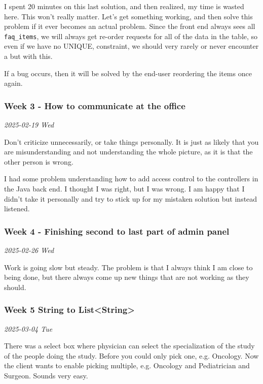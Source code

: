 \documentclass[../main.tex]{subfiles}
\begin{document}
I spent 20 minutes on this last solution, and then realized, my time is wasted here. This won't really matter. Let's get something working, and then solve this problem if it ever becomes an actual problem. Since the front end always sees all \verb|faq_items|, we will always get re-order requests for all of the data in the table, so even if we have no UNIQUE, constraint, we should very rarely or never encounter a but with this.

If a bug occurs, then it will be solved by the end-user reordering the items once again.\strut

\subsubsection{Week 3 - How to communicate at the office}

\noindent \textit{2025-02-19 Wed}
\smallskip

Don't criticize unnecessarily, or take things personally.
It is just as likely that you are misunderstanding and not understanding the whole picture, as it is that the other person is wrong.

I had some problem understanding how to add access control to the controllers in the Java back end.
I thought I was right, but I was wrong.
I am happy that I didn't take it personally and try to stick up for my mistaken solution but instead listened.


\subsubsection{Week 4 - Finishing second to last part of admin panel}

\noindent \textit{2025-02-26 Wed}
\smallskip

Work is going slow but steady.
The problem is that I always think I am close to being done, but there always come up new things that are not working as they should. 

\subsubsection{Week 5 String to List\textless String\textgreater{}}

\noindent \textit{2025-03-04 Tue}
\smallskip

There was a select box where physician can select the specialization of the study of the people doing the study. Before you could only pick one, e.g. Oncology. Now the client wants to enable picking multiple, e.g. Oncology and Pediatrician and Surgeon. Sounds very easy.
\end{document}
